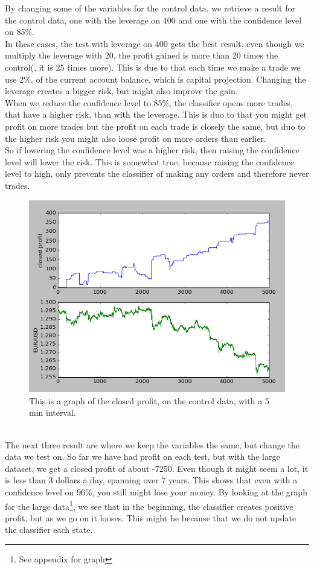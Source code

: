 \documentclass[10pt]{IEEEtran}
\begin{document}
By changing some of the variables for the control data, we retrieve a result for the control data, one with the leverage on 400 and one with the confidence level on 85\%.\\
In these cases, the test with leverage on 400 gets the best result, even though we multiply the leverage with 20, the profit gained is more than 20 times the control(, it is 25 times more). This is due to that each time we make a trade we use 2\%, of the current account balance, which is capital projection. Changing the leverage creates a bigger risk, but might also improve the gain.\\
When we reduce the confidence level to 85\%, the classifier opens more trades, that have a higher risk, than with the leverage. This is duo to that you might get profit on more trades but the profit on each trade is closely the same, but duo to the higher risk you might also loose profit on more orders than earlier.\\
So if lowering the confidence level was a higher risk, then raising the confidence level will lower the risk. This is somewhat true, because raising the confidence level to high, only prevents the classifier of making any orders and therefore never trades.\\  
\begin{figure}[h]
    \includegraphics[scale = 0.4]{data-96-10000-20.png}
    \caption{This is a graph of the closed profit, on the control data, with a 5 min interval.}
\end{figure}
\\
The next three result are where we keep the variables the same, but change the data we test on. So far we have had profit on each test, but with the large dataset, we get a closed profit of about -7250. Even though it might seem a lot, it is less than 3 dollars a day, spanning over 7 years. This shows that even with a confidence level on 96\%, you still might lose your money. By looking at the graph for the large data\footnote{See appendix for graph}, we see that in the beginning, the classifier creates positive profit, but as we go on it looses. This might be because that we do not update the classifier each state.\\
\end{document}

